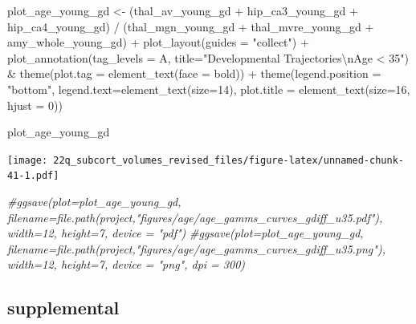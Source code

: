 \documentclass[
]{article}
\newenvironment{Shaded}{\begin{snugshade}}{\end{snugshade}}
\newcommand{\AttributeTok}[1]{\textcolor[rgb]{0.77,0.63,0.00}{#1}}
\newcommand{\CommentTok}[1]{\textcolor[rgb]{0.56,0.35,0.01}{\textit{#1}}}
\newcommand{\DecValTok}[1]{\textcolor[rgb]{0.00,0.00,0.81}{#1}}
\newcommand{\FunctionTok}[1]{\textcolor[rgb]{0.00,0.00,0.00}{#1}}
\newcommand{\NormalTok}[1]{#1}
\newcommand{\OtherTok}[1]{\textcolor[rgb]{0.56,0.35,0.01}{#1}}
\newcommand{\SpecialCharTok}[1]{\textcolor[rgb]{0.00,0.00,0.00}{#1}}
\newcommand{\StringTok}[1]{\textcolor[rgb]{0.31,0.60,0.02}{#1}}
\begin{document}
\begin{Shaded}
\begin{Highlighting}[]
\NormalTok{plot\_age\_young\_gd }\OtherTok{\textless{}{-}}\NormalTok{ (thal\_av\_young\_gd }\SpecialCharTok{+}\NormalTok{ hip\_ca3\_young\_gd }\SpecialCharTok{+}\NormalTok{ hip\_ca4\_young\_gd) }\SpecialCharTok{/}\NormalTok{ (thal\_mgn\_young\_gd }\SpecialCharTok{+}\NormalTok{ thal\_mvre\_young\_gd }\SpecialCharTok{+}\NormalTok{ amy\_whole\_young\_gd) }\SpecialCharTok{+} \FunctionTok{plot\_layout}\NormalTok{(}\AttributeTok{guides =} \StringTok{"collect"}\NormalTok{) }\SpecialCharTok{+} \FunctionTok{plot\_annotation}\NormalTok{(}\AttributeTok{tag\_levels =} \StringTok{\textquotesingle{}A\textquotesingle{}}\NormalTok{, }\AttributeTok{title=}\StringTok{"Developmental Trajectories}\SpecialCharTok{\textbackslash{}n}\StringTok{Age \textless{} 35"}\NormalTok{) }\SpecialCharTok{\&}   \FunctionTok{theme}\NormalTok{(}\AttributeTok{plot.tag =} \FunctionTok{element\_text}\NormalTok{(}\AttributeTok{face =} \StringTok{\textquotesingle{}bold\textquotesingle{}}\NormalTok{)) }\SpecialCharTok{+} \FunctionTok{theme}\NormalTok{(}\AttributeTok{legend.position =} \StringTok{"bottom"}\NormalTok{, }\AttributeTok{legend.text=}\FunctionTok{element\_text}\NormalTok{(}\AttributeTok{size=}\DecValTok{14}\NormalTok{), }\AttributeTok{plot.title =} \FunctionTok{element\_text}\NormalTok{(}\AttributeTok{size=}\DecValTok{16}\NormalTok{, }\AttributeTok{hjust =} \DecValTok{0}\NormalTok{)) }

\NormalTok{plot\_age\_young\_gd}
\end{Highlighting}
\end{Shaded}

\texttt{[image: 22q\_subcort\_volumes\_revised\_files/figure-latex/unnamed-chunk-41-1.pdf]}

\begin{Shaded}
\begin{Highlighting}[]
\CommentTok{\#ggsave(plot=plot\_age\_young\_gd, filename=file.path(project,"figures/age/age\_gamms\_curves\_gdiff\_u35.pdf"), width=12, height=7, device = "pdf")}
\CommentTok{\#ggsave(plot=plot\_age\_young\_gd, filename=file.path(project,"figures/age/age\_gamms\_curves\_gdiff\_u35.png"), width=12, height=7, device = "png", dpi = 300)}
\end{Highlighting}
\end{Shaded}

\hypertarget{supplemental}{%
\subsection{supplemental}\label{supplemental}}
\end{document}
